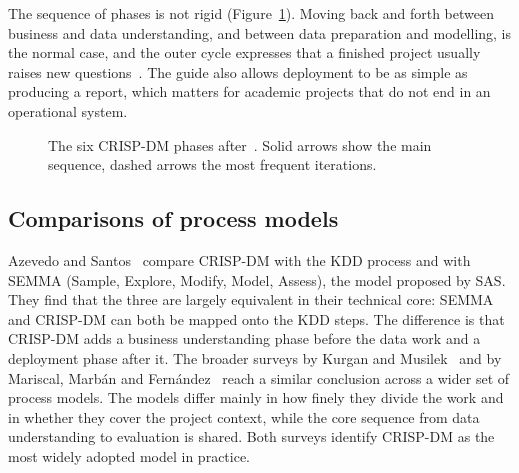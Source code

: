 \documentclass[11pt,a4paper]{article}
\begin{document}
\noindent
The sequence of phases is not rigid (Figure~\ref{fig:crispdm}). Moving back and
forth between business and data understanding, and between data preparation and
modelling, is the normal case, and the outer cycle expresses that a finished
project usually raises new questions~\cite{chapman2000,wirth2000}. The guide
also allows deployment to be as simple as producing a report, which matters for
academic projects that do not end in an operational system.

\begin{figure}[ht]
\centering
{}
\caption{The six CRISP-DM phases after~\cite{chapman2000}. Solid arrows show
the main sequence, dashed arrows the most frequent iterations.}
\label{fig:crispdm}
\end{figure}

\subsection{Comparisons of process models}

Azevedo and Santos~\cite{azevedo2008} compare CRISP-DM with the KDD process and
with SEMMA (Sample, Explore, Modify, Model, Assess), the model proposed by SAS.
They find that the three are largely equivalent in their technical core: SEMMA
and CRISP-DM can both be mapped onto the KDD steps. The difference is that
CRISP-DM adds a business understanding phase before the data work and a
deployment phase after it. The broader surveys by Kurgan and
Musilek~\cite{kurgan2006} and by Mariscal, Marb\'an and
Fern\'andez~\cite{mariscal2010} reach a similar conclusion across a wider set of
process models. The models differ mainly in how finely they divide the work and
in whether they cover the project context, while the core sequence from data
understanding to evaluation is shared. Both surveys identify CRISP-DM as the
most widely adopted model in practice.
\end{document}
